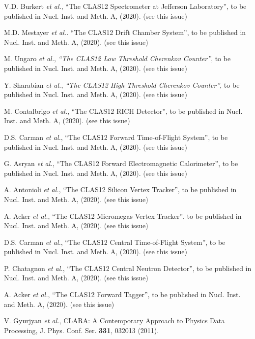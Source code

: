 \documentclass[3p,times,twocolumn]{elsarticle}
\begin{document}
\begin{thebibliography}{99}

V.D. Burkert {\it et al.}, ``The CLAS12 Spectrometer at Jefferson Laboratory'', to be published in Nucl.
Inst. and Meth. A, (2020). (see this issue)

M.D. Mestayer {\it et al.}. ``The CLAS12 Drift Chamber System'', to be published in Nucl. Inst. and
Meth. A, (2020). (see this issue)

M. Ungaro {\it et al.}, {\it ``The CLAS12 Low Threshold Cherenkov Counter''}, to be published in Nucl. Inst.
and Meth. A, (2020). (see this issue)

Y. Sharabian {\it et al.}, {\it ``The CLAS12 High Threshold Cherenkov Counter''}, to be published in Nucl. Inst.
and Meth. A, (2020). (see this issue)
  
M. Contalbrigo {\it et al.}, ``The CLAS12 RICH Detector'', to be published in Nucl. Inst. and
Meth. A, (2020). (see this issue)

D.S. Carman {\it et al.},   ``The CLAS12 Forward Time-of-Flight System'', to be published in Nucl.
Inst. and Meth. A, (2020). (see this issue)

G. Asryan {\it et al.}, ``The CLAS12 Forward Electromagnetic Calorimeter'', to be published in Nucl. Inst. and
Meth. A, (2020). (see this issue)

A. Antonioli {\it et al.}, ``The CLAS12 Silicon Vertex Tracker'', to be published in Nucl. Inst. and
Meth. A, (2020). (see this issue)

A. Acker {\it et al.}, ``The CLAS12 Micromegas Vertex Tracker'', to be published in Nucl. Inst. and
Meth. A, (2020). (see this issue)

D.S. Carman {\it et al.}, ``The CLAS12 Central Time-of-Flight System'', to be published in Nucl.
Inst. and Meth. A, (2020). (see this issue)

P. Chatagnon {\it et al.}, ``The CLAS12 Central Neutron Detector'', to be published in Nucl. Inst. and
Meth. A, (2020). (see this issue)

A. Acker {\it et al.}, ``The CLAS12 Forward Tagger'', to be published in Nucl. Inst. and
Meth. A, (2020). (see this issue)

V. Gyurjyan {\it et al.}, CLARA: A Contemporary Approach to Physics Data Processing, J. Phys. Conf. Ser.
{\bf 331}, 032013 (2011).


\end{thebibliography}
\end{document}
